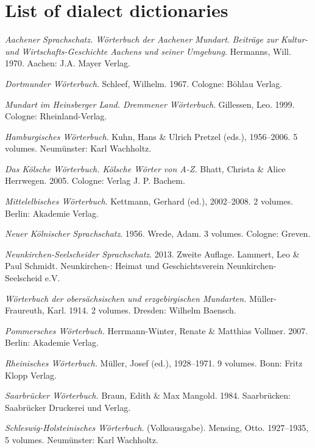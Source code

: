 \chapter{List of dialect dictionaries}\label{appendix:k}

\begin{description}[font=\normalfont]\sloppy
\item[AaWb:]  \textit{Aachener Sprachschatz. Wörterbuch der Aachener Mundart}. \textit{Beiträge zur Kultur- und Wirtschafts-Geschichte Aachens und seiner Umgebung}. Hermanns, Will. 1970. Aachen: J.A. Mayer Verlag.
\item[DoWb:]  \textit{Dortmunder Wörterbuch}. Schleef, Wilhelm. 1967. Cologne: Böhlau Verlag.
\item[DrWb:]  \textit{Mundart im Heinsberger Land. Dremmener Wörterbuch}. Gillessen, Leo. 1999. Cologne: Rheinland-Verlag.
\item[HaWb:]  \textit{Hamburgisches Wörterbuch}. Kuhn, Hans \& Ulrich Pretzel (eds.), 1956--2006. 5 volumes. Neumünster: Karl Wachholtz.
\item[KWb:]  \textit{Das Kölsche Wörterbuch. Kölsche Wörter von A-Z.} Bhatt, Christa \& Alice Herrwegen. 2005. Cologne: Verlag J. P. Bachem.
\item[MiElWb:]  \textit{Mittelelbisches Wörterbuch}. Kettmann, Gerhard (ed.), 2002--2008. 2 volumes. Berlin: Akademie Verlag.
\item[NKSS:]  \textit{Neuer Kölnischer Sprachschatz}. 1956. Wrede, Adam. 3 volumes. Cologne: Greven.
\item[NSSS:]  \textit{Neunkirchen-Seelscheider Sprachschatz}. 2013. Zweite Auflage. Lammert, Leo \& Paul Schmidt. Neunkirchen-: Heimat und Geschichtsverein Neunkirchen-Seelscheid e.V.
\item[ObersWb:]  \textit{Wörterbuch der obersächsischen und erzgebirgischen Mundarten.} Müller-Fraureuth, Karl. 1914. 2 volumes. Dresden: Wilhelm Baensch.
\item[PWb:]  \textit{Pommersches Wörterbuch.} Herrmann-Winter, Renate \& Matthias Vollmer. 2007. Berlin: Akademie Verlag.
\item[RWb:]  \textit{Rheinisches Wörterbuch.} Müller, Josef (ed.), 1928--1971. 9 volumes. Bonn: Fritz Klopp Verlag.
\item[SbWb:] \textit{Saarbrücker Wörterbuch.} Braun, Edith \& Max Mangold. 1984. Saarbrücken: Saabrücker Druckerei und Verlag.
\item[SchlHWb:]  \textit{Schleswig-Holsteinisches Wörterbuch}. (Volksausgabe). Mensing, Otto. 1927--1935, 5 volumes. Neumünster: Karl Wachholtz.

\end{description}
